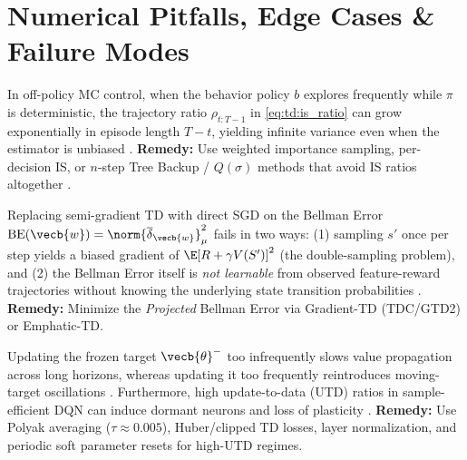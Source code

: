 \documentclass[../../../../master.tex]{subfiles}
\begin{document}
\section{Numerical Pitfalls, Edge Cases \& Failure Modes}
\label{sec:td:pitfalls}

\begin{pitfall}
In off-policy MC control, when the behavior policy $b$ explores frequently while $\pi$ is deterministic, the trajectory ratio $\rho_{t:T-1}$ in \eqref{eq:td:is_ratio} can grow exponentially in episode length $T - t$, yielding infinite variance even when the estimator is unbiased . \textbf{Remedy:} Use weighted importance sampling, per-decision IS, or $n$-step Tree Backup / $Q(\sigma)$ methods that avoid IS ratios altogether .
\end{pitfall}

\begin{pitfall}
Replacing semi-gradient TD with direct SGD on the Bellman Error $\mathrm{BE}(\vecb{w}) = \norm{\overline{\delta}_{\vecb{w}}}_\mu^2$ fails in two ways: (1) sampling $s'$ once per step yields a biased gradient of $\E[R + \gamma V(S')]^2$ (the double-sampling problem), and (2) the Bellman Error itself is \emph{not learnable} from observed feature-reward trajectories without knowing the underlying state transition probabilities . \textbf{Remedy:} Minimize the \emph{Projected} Bellman Error via Gradient-TD (TDC/GTD2) or Emphatic-TD.
\end{pitfall}

\begin{pitfall}
Updating the frozen target $\vecb{\theta}^-$ too infrequently slows value propagation across long horizons, whereas updating it too frequently reintroduces moving-target oscillations . Furthermore, high update-to-data (UTD) ratios in sample-efficient DQN can induce dormant neurons and loss of plasticity . \textbf{Remedy:} Use Polyak averaging ($\tau \approx 0.005$), Huber/clipped TD losses, layer normalization, and periodic soft parameter resets for high-UTD regimes.
\end{pitfall}

\endgroup
\end{document}
